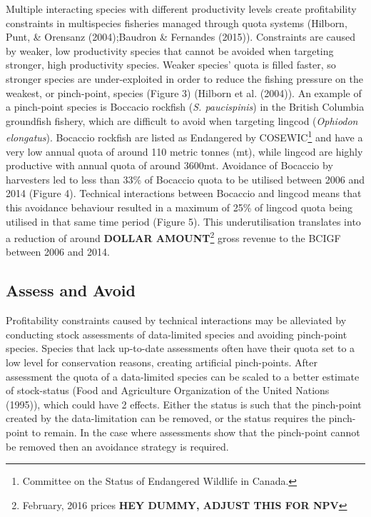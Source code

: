 \documentclass[12pt,]{scrartcl}
\begin{document}
Multiple interacting species with different productivity levels create
profitability constraints in multispecies fisheries managed through
quota systems (Hilborn, Punt, \& Orensanz (2004);Baudron \& Fernandes
(2015)). Constraints are caused by weaker, low productivity species that
cannot be avoided when targeting stronger, high productivity species.
Weaker species' quota is filled faster, so stronger species are
under-exploited in order to reduce the fishing pressure on the weakest,
or pinch-point, species (Figure 3) (Hilborn et al. (2004)). An example
of a pinch-point species is Boccacio rockfish (\emph{S. paucispinis}) in
the British Columbia groundfish fishery, which are difficult to avoid
when targeting lingcod (\emph{Ophiodon elongatus}). Bocaccio rockfish
are listed as Endangered by COSEWIC\footnote{Committee on the Status of
  Endangered Wildlife in Canada.} and have a very low annual quota of
around 110 metric tonnes (mt), while lingcod are highly productive with
annual quota of around 3600mt. Avoidance of Bocaccio by harvesters led
to less than 33\% of Bocaccio quota to be utilised between 2006 and 2014
(Figure 4). Technical interactions between Bocaccio and lingcod means
that this avoidance behaviour resulted in a maximum of 25\% of lingcod
quota being utilised in that same time period (Figure 5). This
underutilisation translates into a reduction of around \textbf{DOLLAR
AMOUNT}\footnote{February, 2016 prices \textbf{HEY DUMMY, ADJUST THIS
  FOR NPV}} gross revenue to the BCIGF between 2006 and 2014.

\subsection{Assess and Avoid}\label{assess-and-avoid}

Profitability constraints caused by technical interactions may be
alleviated by conducting stock assessments of data-limited species and
avoiding pinch-point species. Species that lack up-to-date assessments
often have their quota set to a low level for conservation reasons,
creating artificial pinch-points. After assessment the quota of a
data-limited species can be scaled to a better estimate of stock-status
(Food and Agriculture Organization of the United Nations (1995)), which
could have 2 effects. Either the status is such that the pinch-point
created by the data-limitation can be removed, or the status requires
the pinch-point to remain. In the case where assessments show that the
pinch-point cannot be removed then an avoidance strategy is required.
\end{document}
